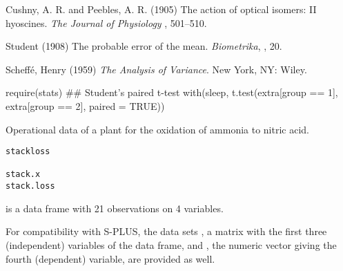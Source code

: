 %
\begin{Source}\relax
Cushny, A. R. and Peebles, A. R. (1905)
The action of optical isomers: II hyoscines.
\emph{The Journal of Physiology} , 501--510.

Student (1908)
The probable error of the mean.
\emph{Biometrika}, , 20.
\end{Source}
%
\begin{References}\relax
Scheffé, Henry (1959)
\emph{The Analysis of Variance}.
New York, NY: Wiley.
\end{References}
%
\begin{Examples}
\begin{ExampleCode}
require(stats)
## Student's paired t-test
with(sleep,
     t.test(extra[group == 1],
            extra[group == 2], paired = TRUE))
\end{ExampleCode}
\end{Examples}
%
\begin{Description}\relax
Operational data of a plant for the oxidation of ammonia to nitric
acid.
\end{Description}
%
\begin{Usage}
\begin{verbatim}
stackloss

stack.x
stack.loss
\end{verbatim}
\end{Usage}
%
\begin{Format}
 is a data frame with 21 observations on 4 variables.



For compatibility with S-PLUS, the data sets , a matrix
with the first three (independent) variables of the data frame, and
, the numeric vector giving the fourth (dependent)
variable, are provided as well.
\end{Format}
%

